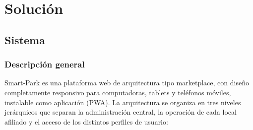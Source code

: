 
\section{Solución}

\subsection{Sistema}

\subsubsection{Descripción general}

Smart-Park es una plataforma web de arquitectura tipo marketplace, con diseño completamente responsivo para computadoras, tablets y teléfonos móviles, instalable como aplicación (PWA). La arquitectura se organiza en tres niveles jerárquicos que separan la administración central, la operación de cada local afiliado y el acceso de los distintos perfiles de usuario:

